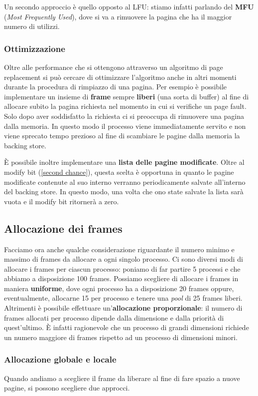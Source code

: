 Un secondo approccio è quello opposto al LFU: stiamo infatti parlando del \textbf{MFU} (\textit{Most Frequently Used}), dove si va a rimuovere la pagina che ha il maggior numero di utilizzi.  

% 
\subsubsection{Ottimizzazione}
Oltre alle performance che si ottengono attraverso un algoritmo di page replacement si può cercare di ottimizzare l'algoritmo anche in altri momenti durante la procedura di rimpiazzo di una pagina. Per esempio è possibile implementare un insieme di \textbf{frame} sempre \textbf{liberi} (una sorta di buffer) al fine di allocare subito la pagina richiesta nel momento in cui si verifiche un page fault. Solo dopo aver soddisfatto la richiesta ci si preoccupa di rimuovere una pagina dalla memoria. In questo modo il processo viene immediatamente servito e non viene sprecato tempo prezioso al fine di scambiare le pagine dalla memoria la backing store. 

È possibile inoltre implementare una \textbf{lista delle pagine modificate}. Oltre al modify bit (\ref{second chance}), questa scelta è opportuna in quanto le pagine modificate contenute al suo interno verranno periodicamente salvate all'interno del backing store. In questo modo, una volta che ono state salvate la lista sarà vuota e il modify bit ritornerà a zero. 

%
\subsection{Allocazione dei frames}
Facciamo ora anche qualche considerazione riguardante il numero minimo e massimo di frames da allocare a ogni singolo processo. Ci sono diversi modi di allocare i frames per ciascun processo: poniamo di far partire 5 processi e che abbiamo a disposizione 100 frames. Possiamo scegliere di allocare i frames in maniera \textbf{uniforme}, dove ogni processo ha a disposizione 20 frames oppure, eventualmente, allocarne 15 per processo e tenere una \textit{pool} di 25 frames liberi. Altrimenti è possibile effettuare un'\textbf{allocazione proporzionale}: il numero di frames allocati per processo dipende dalla dimensione e dalla priorità di quest'ultimo. È infatti ragionevole che un processo di grandi dimensioni richiede un numero maggiore di frames rispetto ad un processo di dimensioni minori.

% 
\subsubsection{Allocazione globale e locale}
Quando andiamo a scegliere il frame da liberare al fine di fare spazio a nuove pagine, si possono scegliere due approcci.

